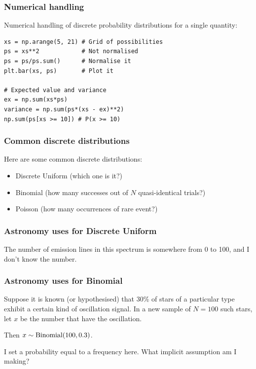 \documentclass{beamer}
\begin{document}
\begin{frame}[t, fragile]
\frametitle{Numerical handling}
Numerical handling of discrete probability distributions for a single
quantity: \vspace{2em}

\begin{verbatim}
xs = np.arange(5, 21) # Grid of possibilities
ps = xs**2            # Not normalised
ps = ps/ps.sum()      # Normalise it
plt.bar(xs, ps)       # Plot it

# Expected value and variance
ex = np.sum(xs*ps) 
variance = np.sum(ps*(xs - ex)**2)
np.sum(ps[xs >= 10]) # P(x >= 10)
\end{verbatim}


\end{frame}




\begin{frame}[t, fragile]
\frametitle{Common discrete distributions}

Here are some common discrete distributions:

\begin{itemize}
\item <2-> Discrete Uniform (which one is it?)
\item <3-> Binomial (how many successes out of $N$ quasi-identical trials?)
\item <4-> Poisson (how many occurrences of rare event?)
\end{itemize}

\end{frame}


\begin{frame}[t, fragile]
\frametitle{Astronomy uses for Discrete Uniform}

The number of emission lines in this spectrum is somewhere from
0 to 100, and I don't know the number.

\end{frame}


\begin{frame}[t, fragile]
\frametitle{Astronomy uses for Binomial}

Suppose it is known (or hypothesised) that 30\% of stars of a particular type
exhibit a certain kind of oscillation signal. In a new sample of $N=100$
such stars, let $x$ be the number that have the oscillation.\vspace{1em}

Then $x \sim \textnormal{Binomial}(100, 0.3)$.

\vspace{2em}
{\tiny I set a probability equal to a frequency here. What implicit
 assumption am I making?}
\end{frame}
\end{document}
